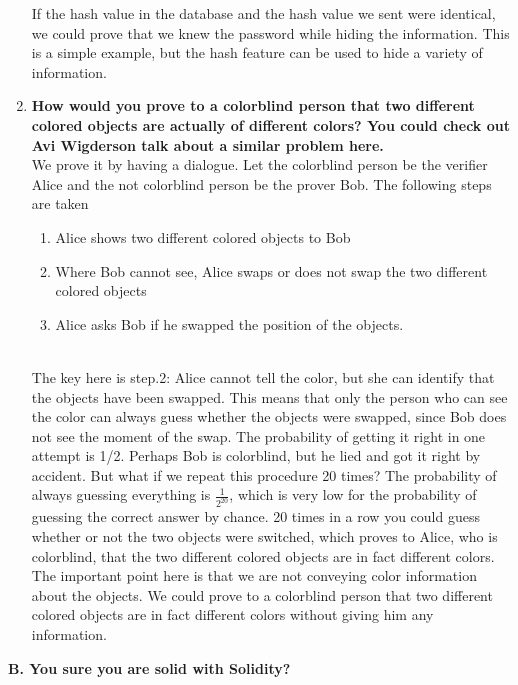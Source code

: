 \documentclass[a4paper,10pt]{jsarticle}
\begin{document}
\begin{enumerate}
    If the hash value in the database and the hash value we sent were identical, we could prove that we knew the password while hiding the information. This is a simple example, but the hash feature can be used to hide a variety of information.
    \newline
    \item \textbf{\large{How would you prove to a colorblind person that two different colored objects are actually of different colors? You could check out Avi Wigderson talk about a similar problem here. }}\mbox{}\\
    \newline
    We prove it by having a dialogue.
    Let the colorblind person be the verifier Alice and the not colorblind person be the prover Bob.
    The following steps are taken
    \newline
    \begin{enumerate}[step.1]
      \item Alice shows two different colored objects to Bob
      \item Where Bob cannot see, Alice swaps or does not swap the two different colored objects
      \item Alice asks Bob if he swapped the position of the objects.
    \end{enumerate}\mbox{}\\
    The key here is step.2: Alice cannot tell the color, but she can identify that the objects have been swapped. This means that only the person who can see the color can always guess whether the objects were swapped, since Bob does not see the moment of the swap.
    The probability of getting it right in one attempt is 1/2.
    Perhaps Bob is colorblind, but he lied and got it right by accident. But what if we repeat this procedure 20 times? The probability of always guessing everything is $\frac{1}{2^{20}}$, which is very low for the probability of guessing the correct answer by chance. 
    20 times in a row you could guess whether or not the two objects were switched, which proves to Alice, who is colorblind, that the two different colored objects are in fact different colors. The important point here is that we are not conveying color information about the objects. 
    We could prove to a colorblind person that two different colored objects are in fact different colors without giving him any information.
     
  \end{enumerate}
  \newpage
  \begin{center}
    \textbf{\large{B. You sure you are solid with Solidity?}}
  \end{center}
\end{document}
